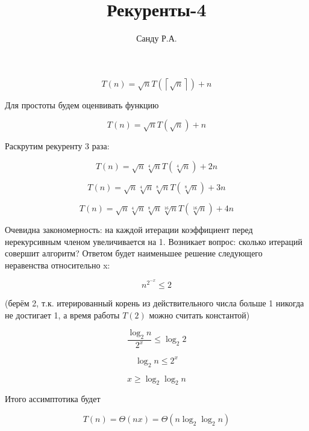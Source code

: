 \documentclass[11pt]{article}
\title{Рекуренты-4}
\author{Санду Р.А.}
\begin{document}
\maketitle

\[
	T\left(n\right)=\sqrt{n}T\left(\left\lceil\sqrt{n}\right\rceil\right)+n
\]

Для простоты будем оценвивать функцию

\[
	T\left(n\right)=\sqrt{n}T\left(\sqrt{n}\right)+n
\]

Раскрутим рекуренту 3 раза:

\[
	T\left(n\right) = \sqrt{n}\sqrt[4]{n}T\left(\sqrt[4]{n}\right)+2n
\]

\[
	T\left(n\right) = \sqrt{n}\sqrt[4]{n}\sqrt[8]{n}T\left(\sqrt[8]{n}\right)+3n
\]

\[
	T\left(n\right) = \sqrt{n}\sqrt[4]{n}\sqrt[8]{n}\sqrt[16]{n}T\left(\sqrt[16]{n}\right)+4n
\]

Очевидна закономерность: на каждой итерации коэффициент перед нерекурсивным членом увеличивается на 1. Возникает вопрос: сколько итераций совершит алгоритм? Ответом будет наименьшее решение следующего неравенства относительно x:

\[
	n^{2^{-x}} \leq 2
\]

(берём 2, т.к. итерированный корень из действительного числа больше 1 никогда не достигает 1, а время работы $T(2)$ можно считать константой)

\[
	\frac{\log_2{n}}{2^x} \leq \log_2{2}
\]

\[
	\log_2{n} \leq 2^x
\]

\[
	x \geq \log_2{\log_2{n}}
\]

Итого ассимптотика будет

\[
	T\left(n\right) = \Theta\left(nx\right) = \Theta\left(n\log_2{\log_2{n}}\right)
\]
\end{document}
